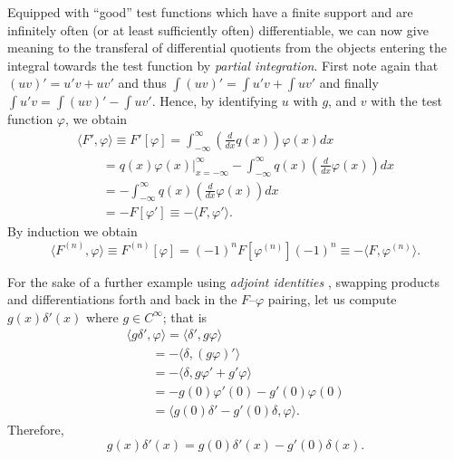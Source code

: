 Equipped with ``good'' test functions
which have a finite support and are
infinitely often (or at least sufficiently often) differentiable,
we can now give meaning to the transferal  of differential quotients from
the objects entering the integral towards the test function by {\em partial integration}.
First note again that $(uv)' = u'v+uv'$
and thus
$\int (uv)' = \int u'v+\int uv'$
and finally   $\int u'v = \int (uv)'  -\int uv'$.
Hence,     by identifying $u$ with $g$, and $v$ with the test function $\varphi$, we obtain
\begin{equation}
\begin{split}
\langle {F}' , \varphi \rangle \equiv {F}'\left[\varphi\right] =
\int_{-\infty}^\infty
\left( \frac{d}{dx} q(x)\right) \varphi (x) dx
\\
\qquad =
\left. q(x) \varphi (x) \right|_{x=-\infty}^\infty
- \int_{-\infty}^\infty
q(x)\left( \frac{d}{dx} \varphi (x) \right) dx \\
\qquad =
- \int_{-\infty}^\infty
q(x)\left( \frac{d}{dx} \varphi (x) \right) dx \\
\qquad =-F\left[\varphi  '\right] \equiv - \langle {F} , \varphi '\rangle .
\end{split}
\end{equation}
By induction we obtain
\begin{equation}
\langle {F}^{(n)} , \varphi \rangle \equiv F^{(n)}\left[\varphi\right]
 =(-1)^n F\left[\varphi  ^{(n)}\right]
 (-1)^n  \equiv - \langle {F} , \varphi^{(n)}\rangle.
\end{equation}


{
\color{blue}
\bexample
For the sake of a further example using {\em adjoint identities}
,
swapping products and differentiations forth and back
in the $F$--$\varphi$ pairing, let us compute
$g(x)\delta' (x)$ where $g \in C^\infty$; that is
\begin{equation}
\begin{split}
\langle g \delta'   , \varphi \rangle
=
\langle \delta'   , g  \varphi \rangle
\\
\qquad =
- \langle \delta   , (g  \varphi )'\rangle
\\
\qquad =
- \langle \delta   ,  g  \varphi  '+ g'  \varphi  \rangle
\\
\qquad =
-  g(0)  \varphi ' (0) - g'(0)  \varphi(0)
\\
\qquad =
  \langle g(0) \delta '   -  g'(0)\delta , \varphi   \rangle
.
\end{split}
\end{equation}
\eexample
}
Therefore,
\begin{equation}
g(x)\delta' (x)=g(0) \delta '(x)   -  g'(0)\delta (x) .
\label{2012-m-ch-di-sederi}
\end{equation}




